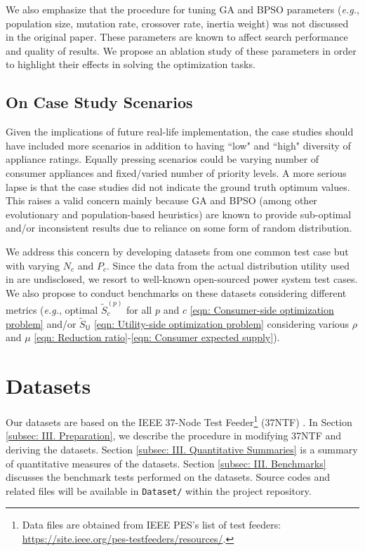 \documentclass[journal, a4paper]{IEEEtran}
\begin{document}
We also emphasize that the procedure for tuning GA and BPSO parameters
(\textit{e.g.}, population size, mutation rate, crossover rate, inertia weight)
was not discussed in the original paper.
These parameters are known to affect search performance and quality of results.
We propose an ablation study of these parameters in order to highlight their effects in solving the optimization tasks.

\subsection{On Case Study Scenarios}
\label{subsec: II. On Case Study Scenarios}

Given the implications of future real-life implementation,
the case studies should have included more scenarios
in addition to having ``low" and ``high" diversity of appliance ratings.
Equally pressing scenarios could be varying number of consumer appliances and fixed/varied number of priority levels.
A more serious lapse is that the case studies did not indicate the ground truth optimum values.
This raises a valid concern mainly because GA and BPSO
(among other evolutionary and population-based heuristics)
are known to provide sub-optimal and/or inconsistent results due to reliance on some form of random distribution.

We address this concern by developing datasets from one common test case but with varying $N_c$ and $P_c$.
Since the data from the actual distribution utility used in \cite{Jabian2020} are undisclosed,
we resort to well-known open-sourced power system test cases.
We also propose to conduct benchmarks on these datasets considering different metrics
(\textit{e.g.}, optimal $\tilde{S}_{c}^{\left(p\right)}$ for all $p$ and $c$ \eqref{eqn: Consumer-side optimization problem}
and/or $\tilde{S}_{\mathsf{U}}$ \eqref{eqn: Utility-side optimization problem}
considering various $\rho$ and $\mu$ \eqref{eqn: Reduction ratio}-\eqref{eqn: Consumer expected supply}).

\section{Datasets}
\label{sec: Datasets}

Our datasets are based on the IEEE 37-Node Test Feeder\footnote{
	Data files are obtained from IEEE PES's list of test feeders:
	\url{https://site.ieee.org/pes-testfeeders/resources/}.
}
(37NTF) \cite{Kersting2001}.
In Section \ref{subsec: III. Preparation}, we describe the procedure in modifying 37NTF and deriving the datasets.
Section \ref{subsec: III. Quantitative Summaries} is a summary of quantitative measures of the datasets.
Section \ref{subsec: III. Benchmarks} discusses the benchmark tests performed on the datasets.
Source codes and related files will be available in \texttt{Dataset/} within the project repository.
\end{document}
